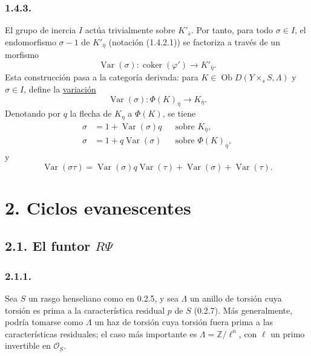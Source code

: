 \subsubsection*{1.4.3.}
El grupo de inercia $I$ actúa trivialmente sobre $K'_{\bar s}$. Por tanto,
para todo $\sigma\in I$, el endomorfismo $\sigma-1$ de $K'_{\bar\eta}$
(notación (1.4.2.1)) se factoriza a través de un morfismo
\begin{equation*}
\operatorname{Var}(\sigma):
\operatorname{coker}(\varphi')\longrightarrow K'_{\bar\eta}.
\end{equation*}
Esta construcción pasa a la categoría derivada: para
$K\in\operatorname{Ob}D(Y\times_sS,\Lambda)$ y $\sigma\in I$, define la
\underline{variación}
\begin{equation}\tag{1.4.3.1}
\operatorname{Var}(\sigma):
\Phi(K)_{\bar\eta}\longrightarrow K_{\bar\eta}.
\end{equation}
Denotando por $q$ la flecha de $K_\eta$ a $\Phi(K)$, se tiene
\begin{align}
\sigma&=1+\operatorname{Var}(\sigma)q
&&\text{sobre }K_{\bar\eta}, \tag{1.4.3.2}\\
\sigma&=1+q\operatorname{Var}(\sigma)
&&\text{sobre }\Phi(K)_{\bar\eta}, \tag{1.4.3.3}
\end{align}
y
\begin{equation}\tag{1.4.3.4}
\operatorname{Var}(\sigma\tau)
=\operatorname{Var}(\sigma)q\operatorname{Var}(\tau)
 +\operatorname{Var}(\sigma)+\operatorname{Var}(\tau).
\end{equation}

\section*{2. Ciclos evanescentes}

\subsection*{\texorpdfstring{2.1. El funtor $R\Psi$}{2.1. El funtor R Psi}}

\subsubsection*{2.1.1.}
Sea $S$ un rasgo henseliano como en 0.2.5, y sea $\Lambda$ un anillo de
torsión cuya torsión es prima a la característica residual $p$ de $S$
(0.2.7). Más generalmente, podría tomarse como $\Lambda$ un haz de torsión
cuya torsión fuera prima a las características residuales; el caso más
importante es $\Lambda=\mathbb Z/\ell^n$, con $\ell$ un primo invertible en
$\mathcal O_S$.

